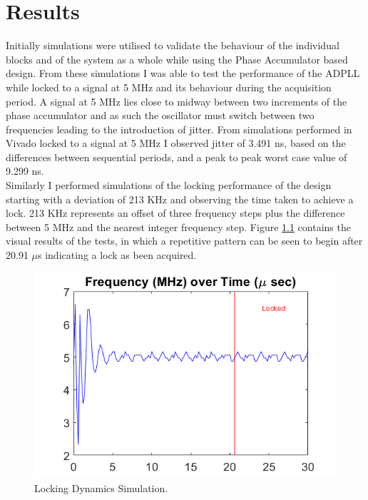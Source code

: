 \documentclass[11pt,english,british]{report}
\begin{document}
\chapter{Results}

Initially simulations were utilised to validate the behaviour of the individual blocks and of the system as a whole while using the Phase Accumulator based design. From these simulations I was able to test the performance of the ADPLL while locked to a signal at 5 MHz and its behaviour during the acquisition period. A signal at 5 MHz lies close to midway between two increments of the phase accumulator and as such the oscillator must switch between two frequencies leading to the introduction of jitter. From simulations performed in Vivado locked to a signal at 5 MHz I observed jitter of 3.491 ns, based on the differences between sequential periods, and a peak to peak worst case value of 9.299 ns.\\
Similarly I performed simulations of the locking performance of the design starting with a deviation of 213 KHz and observing the time taken to achieve a lock. 213 KHz represents an offset of three frequency steps plus the difference between 5 MHz and the nearest integer frequency step. Figure \ref{fig:vivado_sim} contains the visual results of the tests, in which a repetitive pattern can be seen to begin after 20.91 $\mu$s indicating a lock as been acquired.
\begin{figure}[h]
	\centering
	\includegraphics[scale=0.45]{../sim_locking_rect}
	\caption{Locking Dynamics Simulation.}
	\label{fig:vivado_sim}
\end{figure}\\
\end{document}
